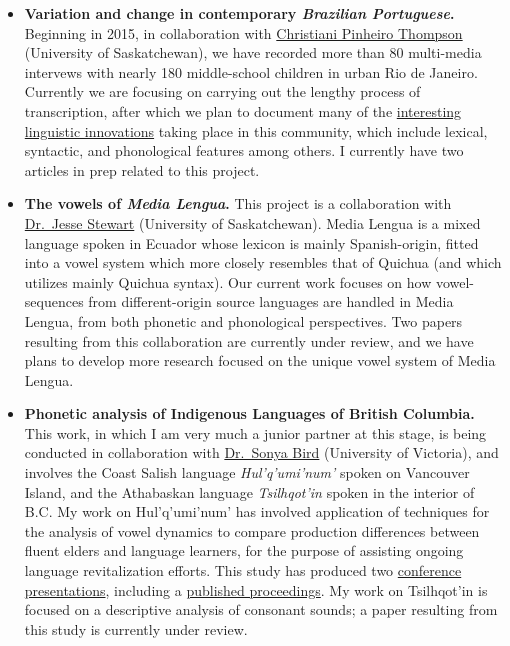 \documentclass[
]{article}
\begin{document}
\begin{itemize}
\item
  \textbf{Variation and change in contemporary \emph{Brazilian
  Portuguese}.} Beginning in 2015, in collaboration with
  \href{https://artsandscience.usask.ca/linguistics/graduates/current-graduate-students.php}{Christiani
  Pinheiro Thompson} (University of Saskatchewan), we have recorded more
  than 80 multi-media intervews with nearly 180 middle-school children
  in urban Rio de Janeiro. Currently we are focusing on carrying out the
  lengthy process of transcription, after which we plan to document many
  of the
  \href{pdf/Thompson,\%20Onosson\%20-\%202016\%20-\%20New\%20Ways\%20of\%20Analyzing\%20Variation\%2045.pdf}{interesting
  linguistic innovations} taking place in this community, which include
  lexical, syntactic, and phonological features among others. I
  currently have two articles in prep related to this project.
\item
  \textbf{The vowels of \emph{Media Lengua}.} This project is a
  collaboration with \href{http://www.jessestewart.net/}{Dr.~Jesse
  Stewart} (University of Saskatchewan). Media Lengua is a mixed
  language spoken in Ecuador whose lexicon is mainly Spanish-origin,
  fitted into a vowel system which more closely resembles that of
  Quichua (and which utilizes mainly Quichua syntax). Our current work
  focuses on how vowel-sequences from different-origin source languages
  are handled in Media Lengua, from both phonetic and phonological
  perspectives. Two papers resulting from this collaboration are
  currently under review, and we have plans to develop more research
  focused on the unique vowel system of Media Lengua.
\item
  \textbf{Phonetic analysis of Indigenous Languages of British
  Columbia.} This work, in which I am very much a junior partner at this
  stage, is being conducted in collaboration with
  \href{https://www.uvic.ca/humanities/linguistics/people/faculty/birdsonya.php}{Dr.~Sonya
  Bird} (University of Victoria), and involves the Coast Salish language
  \emph{Hul'q'umi'num'} spoken on Vancouver Island, and the Athabaskan
  language \emph{Tsilhqot'in} spoken in the interior of B.C. My work on
  Hul'q'umi'num' has involved application of techniques for the analysis
  of vowel dynamics to compare production differences between fluent
  elders and language learners, for the purpose of assisting ongoing
  language revitalization efforts. This study has produced two
  \href{pdf/Onosson\%20-\%202019\%20-\%20Prairie\%20Workshop\%20on\%20Languages\%20and\%20Linguistics\%20V.pdf}{conference
  presentations}, including a
  \href{pdf/Onosson,\%20Bird\%20-\%202019\%20-\%20ICPhS\%20Proceedings.pdf}{published
  proceedings}. My work on Tsilhqot'in is focused on a descriptive
  analysis of consonant sounds; a paper resulting from this study is
  currently under review.
\end{itemize}
\end{document}
